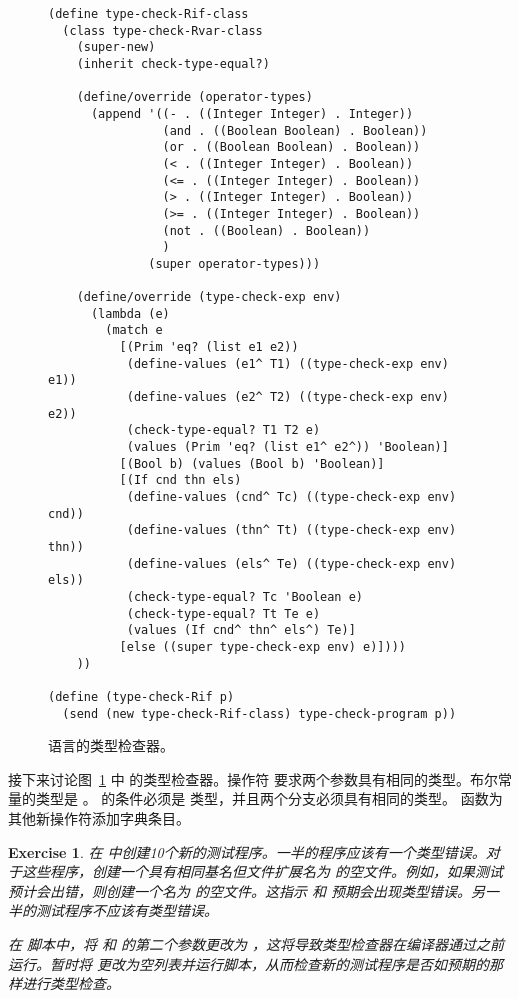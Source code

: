 \documentclass[11pt]{book}
\newtheorem{exercise}[theorem]{Exercise}
\begin{document}
\begin{figure}[tbp]
\begin{lstlisting}
(define type-check-Rif-class
  (class type-check-Rvar-class
    (super-new)
    (inherit check-type-equal?)
    
    (define/override (operator-types)
      (append '((- . ((Integer Integer) . Integer))
                (and . ((Boolean Boolean) . Boolean))
                (or . ((Boolean Boolean) . Boolean))
                (< . ((Integer Integer) . Boolean))
                (<= . ((Integer Integer) . Boolean))
                (> . ((Integer Integer) . Boolean))
                (>= . ((Integer Integer) . Boolean))
                (not . ((Boolean) . Boolean))
                )
              (super operator-types)))

    (define/override (type-check-exp env)
      (lambda (e)
        (match e
          [(Prim 'eq? (list e1 e2))
           (define-values (e1^ T1) ((type-check-exp env) e1))
           (define-values (e2^ T2) ((type-check-exp env) e2))
           (check-type-equal? T1 T2 e)
           (values (Prim 'eq? (list e1^ e2^)) 'Boolean)]
          [(Bool b) (values (Bool b) 'Boolean)]
          [(If cnd thn els)
           (define-values (cnd^ Tc) ((type-check-exp env) cnd))
           (define-values (thn^ Tt) ((type-check-exp env) thn))
           (define-values (els^ Te) ((type-check-exp env) els))
           (check-type-equal? Tc 'Boolean e)
           (check-type-equal? Tt Te e)
           (values (If cnd^ thn^ els^) Te)]
          [else ((super type-check-exp env) e)])))
    ))

(define (type-check-Rif p)
  (send (new type-check-Rif-class) type-check-program p))
\end{lstlisting}
\caption{ \LangIf{} 语言的类型检查器。}
\label{fig:type-check-Rif}
\end{figure}

接下来讨论图~\ref{fig:type-check-Rif} 中 \LangIf{} 的类型检查器。操作符  要求两个参数具有相同的类型。布尔常量的类型是
 。  的条件必须是
 类型，并且两个分支必须具有相同的类型。
 函数为其他新操作符添加字典条目。

\begin{exercise}\normalfont
在 \LangIf{} 中创建10个新的测试程序。一半的程序应该有一个类型错误。对于这些程序，创建一个具有相同基名但文件扩展名为  的空文件。例如，如果测试  预计会出错，则创建一个名为  的空文件。这指示
 和  预期会出现类型错误。另一半的测试程序不应该有类型错误。

在  脚本中，将
 和  的第二个参数更改为
 ，这将导致类型检查器在编译器通过之前运行。暂时将  更改为空列表并运行脚本，从而检查新的测试程序是否如预期的那样进行类型检查。
\end{exercise}
\end{document}
